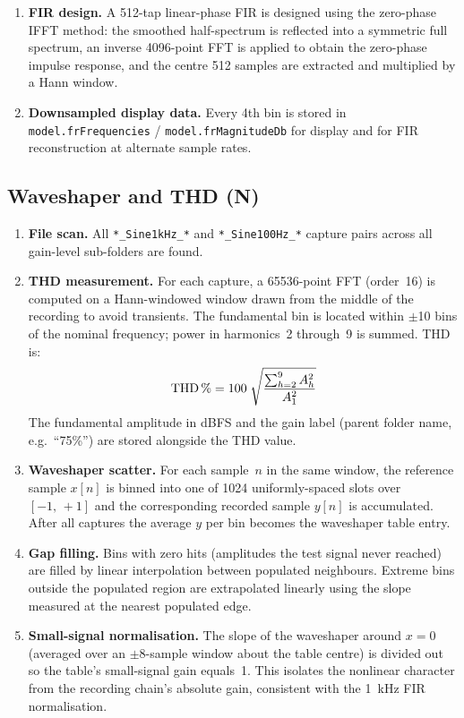 \documentclass[11pt, letterpaper]{article}
\begin{document}
\begin{enumerate}
  \item \textbf{FIR design.}  A 512-tap linear-phase FIR is designed
        using the zero-phase IFFT method: the smoothed half-spectrum is
        reflected into a symmetric full spectrum, an inverse 4096-point
        FFT is applied to obtain the zero-phase impulse response, and
        the centre 512 samples are extracted and multiplied by a Hann
        window.

  \item \textbf{Downsampled display data.}  Every 4th bin is stored
        in \texttt{model.frFrequencies} / \texttt{model.frMagnitudeDb}
        for display and for FIR reconstruction at alternate sample
        rates.
\end{enumerate}

\subsection{Waveshaper and THD (N)}

\begin{enumerate}
  \item \textbf{File scan.}  All \texttt{*\_Sine1kHz\_*} and
        \texttt{*\_Sine100Hz\_*} capture pairs across all gain-level
        sub-folders are found.

  \item \textbf{THD measurement.}  For each capture, a 65536-point
        FFT (order~16) is computed on a Hann-windowed window drawn from
        the middle of the recording to avoid transients.  The
        fundamental bin is located within $\pm$10 bins of the nominal
        frequency; power in harmonics~2 through~9 is summed.  THD is:
        \[
          \text{THD\,\%} = 100\;\sqrt{\frac{\sum_{h=2}^{9} A_h^2}{A_1^2}}
        \]
        The fundamental amplitude in dBFS and the gain label (parent
        folder name, e.g.\ ``75\%'') are stored alongside the THD
        value.

  \item \textbf{Waveshaper scatter.}  For each sample~$n$ in the same
        window, the reference sample \(x[n]\) is binned into one of
        1024 uniformly-spaced slots over \([-1,\,+1]\) and the
        corresponding recorded sample \(y[n]\) is accumulated.  After
        all captures the average \(y\) per bin becomes the waveshaper
        table entry.

  \item \textbf{Gap filling.}  Bins with zero hits (amplitudes the
        test signal never reached) are filled by linear interpolation
        between populated neighbours.  Extreme bins outside the
        populated region are extrapolated linearly using the slope
        measured at the nearest populated edge.

  \item \textbf{Small-signal normalisation.}  The slope of the
        waveshaper around \(x=0\) (averaged over an $\pm$8-sample
        window about the table centre) is divided out so the table's
        small-signal gain equals~1.  This isolates the nonlinear
        character from the recording chain's absolute gain, consistent
        with the 1~kHz FIR normalisation.
\end{enumerate}
\end{document}
